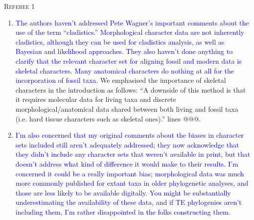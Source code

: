 \documentclass[12pt,letterpaper]{article}
\renewcommand{\section}[1]{%
\bigskip
\begin{center}
\begin{Large}
\normalfont\scshape #1
\medskip
\end{Large}
\end{center}}
\begin{document}
\section{Referee 1}

\begin{enumerate}
\item{\textcolor{blue}{The authors haven’t addressed Pete Wagner’s important comments about the use of the term “cladistics.” Morphological character data are not inherently cladistics, although they can be used for cladistics analysis, as well as Bayesian and likelihood approaches. They also haven’t done anything to clarify that the relevant character set for aligning fossil and modern data is skeletal characters. Many anatomical characters do nothing at all for the incorporation of fossil taxa.}}
We emphasised the importance of skeletal characters in the introduction as follows:
``A downside of this method is that it requires molecular data for living taxa and discrete morphological/anatomical data shared between both living and fossil taxa (i.e. hard tissue characters such as skeletal ones).''
lines @@@.

\item{\textcolor{blue}{I’m also concerned that my original comments about the biases in character sets included still aren’t adequately addressed; they now acknowledge that they didn’t include any character sets that weren’t available in print, but that doesn’t address what kind of difference it would make to their results. I’m concerned it could be a really important bias; morphological data was much more commonly published for extant taxa in older phylogenetic analyses, and those are less likely to be available digitally. You might be substantially underestimating the availability of these data, and if TE phylogenies aren’t including them, I’m rather disappointed in the folks constructing them. }}


\end{enumerate}
\end{document}

